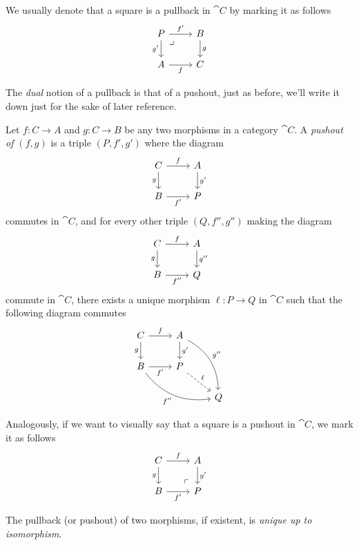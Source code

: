 We usually denote that a square is a pullback in \(\cat C\) by marking it as
follows
\[
\begin{tikzcd}
P \ar[r, "f'"] \ar[d, "g'"'] \ar[dr, phantom, "\lrcorner", very near start]
&B \ar[d, "g"]
\\
A \ar[r, "f"'] &C
\end{tikzcd}
\]

The \emph{dual} notion of a pullback is that of a pushout, just as before,
we'll write it down just for the sake of later reference.

\begin{definition}[Pushout]
\label{def:pushout}
Let \(f: C \to A\) and \(g: C \to B\) be any two morphisms in a category
\(\cat C\). A \emph{pushout of \((f, g)\)} is a triple \((P, f', g')\)
where the diagram
\[
\begin{tikzcd}
C \ar[r, "f"] \ar[d, "g"'] &A \ar[d, "g'"] \\
B \ar[r, "f'"'] &P
\end{tikzcd}
\]
commutes in \(\cat C\), and for every other triple \((Q, f'', g'')\) making the
diagram
\[
\begin{tikzcd}
C \ar[r, "f"] \ar[d, "g"'] &A \ar[d, "g''"] \\
B \ar[r, "f''"'] &Q
\end{tikzcd}
\]
commute in \(\cat C\), there exists a unique morphism \(\ell: P \to Q\) in
\(\cat C\) such that the following diagram commutes
\[
\begin{tikzcd}
C \ar[r, "f"] \ar[d, "g"']
&A \ar[d, "g'"] \ar[drd, bend left, "g''"]
&
\\
B \ar[r, "f'"'] \ar[rrd, bend right, "f''"']
&P \ar[dr, dashed, "\ell"]
&
\\
& &Q
\end{tikzcd}
\]
\end{definition}

Analogously, if we want to visually say that a square is a pushout in \(\cat
C\), we mark it as follows
\[
\begin{tikzcd}
C \ar[r, "f"] \ar[d, "g"'] &A \ar[d, "g'"] \\
B \ar[r, "f'"'] &P \ar[lu, phantom, "\ulcorner", very near start]
\end{tikzcd}
\]

\begin{proposition}[Uniqueness]
\label{prop:pullback-pushout-uniqueness}
The pullback (or pushout) of two morphisms, if existent, is \emph{unique up to
  isomorphism}.
\end{proposition}

